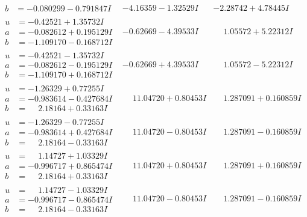 \documentclass[1p]{elsarticle_modified}
\theoremstyle{definition}
\begin{document}
$$\begin{array}{c|c|c}
\begin{aligned}
b &= -0.080299 - 0.791847 I\end{aligned}
 & -4.16359 - 1.32529 I & -2.28742 + 4.78445 I \\ \hline\begin{aligned}
u &= -0.42521 + 1.35732 I \\
a &= -0.082612 + 0.195129 I \\
b &= -1.109170 - 0.168712 I\end{aligned}
 & -0.62669 - 4.39533 I & \phantom{-}1.05572 + 5.22312 I \\ \hline\begin{aligned}
u &= -0.42521 - 1.35732 I \\
a &= -0.082612 - 0.195129 I \\
b &= -1.109170 + 0.168712 I\end{aligned}
 & -0.62669 + 4.39533 I & \phantom{-}1.05572 - 5.22312 I \\ \hline\begin{aligned}
u &= -1.26329 + 0.77255 I \\
a &= -0.983614 - 0.427684 I \\
b &= \phantom{-}2.18164 + 0.33163 I\end{aligned}
 & \phantom{-}11.04720 + 0.80453 I & \phantom{-}1.287091 + 0.160859 I \\ \hline\begin{aligned}
u &= -1.26329 - 0.77255 I \\
a &= -0.983614 + 0.427684 I \\
b &= \phantom{-}2.18164 - 0.33163 I\end{aligned}
 & \phantom{-}11.04720 - 0.80453 I & \phantom{-}1.287091 - 0.160859 I \\ \hline\begin{aligned}
u &= \phantom{-}1.14727 + 1.03329 I \\
a &= -0.996717 + 0.865474 I \\
b &= \phantom{-}2.18164 + 0.33163 I\end{aligned}
 & \phantom{-}11.04720 + 0.80453 I & \phantom{-}1.287091 + 0.160859 I \\ \hline\begin{aligned}
u &= \phantom{-}1.14727 - 1.03329 I \\
a &= -0.996717 - 0.865474 I \\
b &= \phantom{-}2.18164 - 0.33163 I\end{aligned}
 & \phantom{-}11.04720 - 0.80453 I & \phantom{-}1.287091 - 0.160859 I \\ \hline\begin{aligned}

\end{aligned}
\end{array}$$
\end{document}
